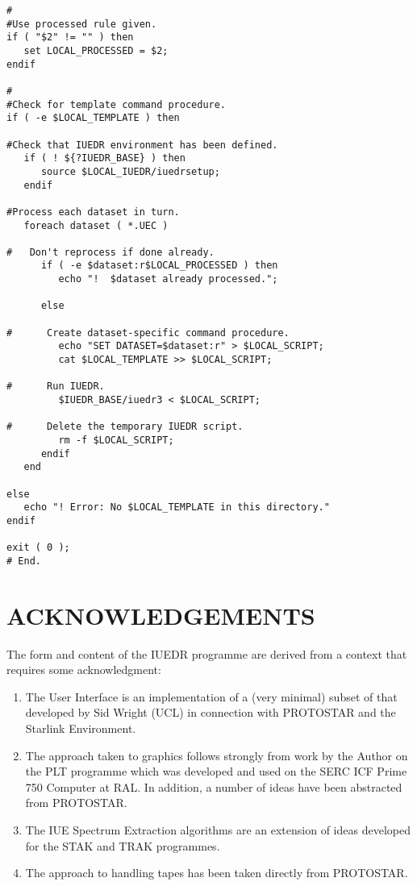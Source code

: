 \begin{verbatim}
#
#Use processed rule given.
if ( "$2" != "" ) then
   set LOCAL_PROCESSED = $2;
endif

#
#Check for template command procedure.
if ( -e $LOCAL_TEMPLATE ) then

#Check that IUEDR environment has been defined.
   if ( ! ${?IUEDR_BASE} ) then
      source $LOCAL_IUEDR/iuedrsetup;
   endif

#Process each dataset in turn.
   foreach dataset ( *.UEC )

#   Don't reprocess if done already.
      if ( -e $dataset:r$LOCAL_PROCESSED ) then
         echo "!  $dataset already processed.";

      else

#      Create dataset-specific command procedure.
         echo "SET DATASET=$dataset:r" > $LOCAL_SCRIPT;
         cat $LOCAL_TEMPLATE >> $LOCAL_SCRIPT;

#      Run IUEDR.
         $IUEDR_BASE/iuedr3 < $LOCAL_SCRIPT;

#      Delete the temporary IUEDR script.
         rm -f $LOCAL_SCRIPT;
      endif
   end

else
   echo "! Error: No $LOCAL_TEMPLATE in this directory."
endif

exit ( 0 );
# End.
\end{verbatim}


\section{\label{se:past}ACKNOWLEDGEMENTS}

The form and content of the IUEDR programme are derived from a context that
requires some acknowledgment:

\begin{enumerate}

\item The User Interface is an implementation of a (very minimal) subset
      of that developed by Sid Wright (UCL) in connection with PROTOSTAR and the
      Starlink Environment.

\item The approach taken to graphics follows strongly from work by the
      Author on the PLT programme which was developed and used on the SERC ICF
      Prime 750 Computer at RAL\@.  In addition, a number of ideas have been
      abstracted from PROTOSTAR\@.

\item The IUE Spectrum Extraction algorithms are an extension of ideas
      developed for the STAK and TRAK programmes.

\item The approach to handling tapes has been taken directly from
      PROTOSTAR\@.

\end{enumerate}

